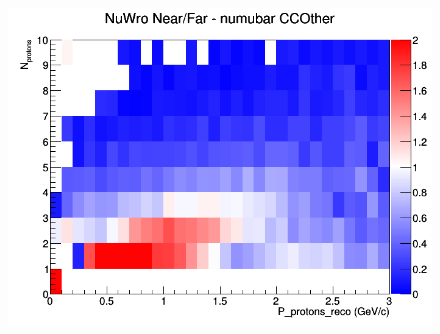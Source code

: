 \begin{figure}[h]
\endminipage
{}
\includegraphics[width=\linewidth]{eff_N_P/FGT/protons/ratios/CCOther_NuWro_numubar_NF_N_P.png}
\endminipage
\newline
\end{figure}
\clearpage
